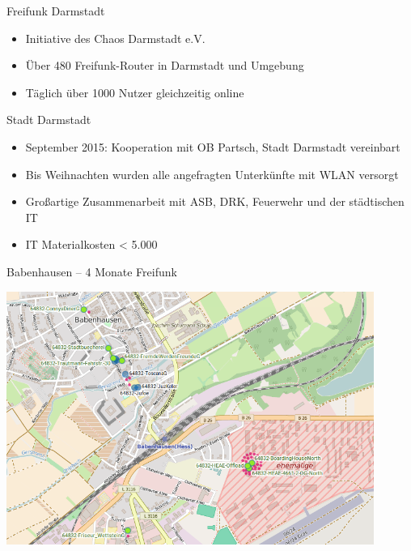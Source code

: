 \documentclass[t]{beamer}
\begin{document}
  \begin{frame}{Freifunk Darmstadt}
    \begin{itemize}
      \item Initiative des Chaos Darmstadt e.V.
      \item Über 480 Freifunk-Router in Darmstadt und Umgebung
      \item Täglich über 1000 Nutzer gleichzeitig online
    \end{itemize}
  \end{frame}

  \begin{frame}{Stadt Darmstadt}
    \begin{itemize}
      \item September 2015: Kooperation mit OB Partsch, Stadt Darmstadt vereinbart
      \item Bis Weihnachten wurden alle angefragten Unterkünfte mit WLAN versorgt
      \item Großartige Zusammenarbeit mit ASB, DRK, Feuerwehr und der städtischen IT
      \item IT Materialkosten < 5.000 \texteuro
    \end{itemize}
  \end{frame}

  \begin{frame}{Babenhausen – 4 Monate Freifunk}
    \begin{center}
      \includegraphics[width=0.9\textwidth]{images/2016-07-21-babenhausen}
    \end{center}
  \end{frame}
\end{document}
